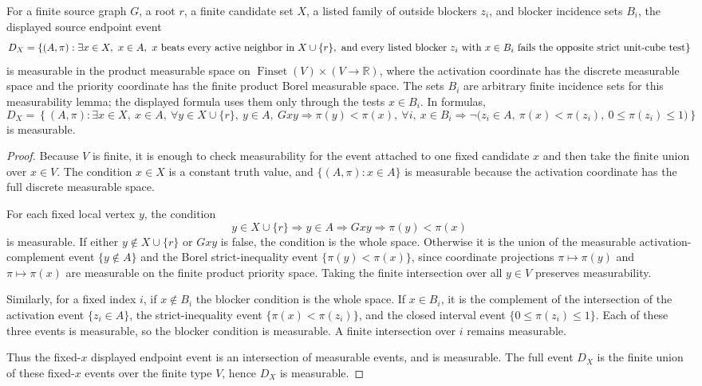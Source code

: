\begin{helper}
For a finite source graph \(G\), a root \(r\), a finite candidate set
\(X\), a listed family of outside blockers \(z_i\), and blocker incidence
sets \(B_i\), the displayed source endpoint event
\[
  D_X=\{(A,\pi):\exists x\in X,\ x\in A,\ x \hbox{ beats every active
  neighbor in }X\cup\{r\},\ \text{and every listed blocker }z_i
  \text{ with }x\in B_i\text{ fails the opposite strict unit-cube test}\}
\]
is measurable in the product measurable space on
\(\operatorname{Finset}(V)\times (V\to\mathbb R)\), where the activation
coordinate has the discrete measurable space and the priority coordinate has
the finite product Borel measurable space.  The sets \(B_i\) are arbitrary
finite incidence sets for this measurability lemma; the displayed formula
uses them only through the tests \(x\in B_i\).  In formulas,
\[
  D_X=
  \left\{(A,\pi):\exists x\in X,\ x\in A,\ 
    \forall y\in X\cup\{r\},\ y\in A,\ Gxy\Rightarrow \pi(y)<\pi(x),
    \ \forall i,\ x\in B_i\Rightarrow
      \neg\bigl(z_i\in A,\ \pi(x)<\pi(z_i),\ 0\le\pi(z_i)\le1\bigr)
  \right\}
\]
is measurable.
\end{helper}
\begin{proof}
Because \(V\) is finite, it is enough to check measurability for the event
attached to one fixed candidate \(x\) and then take the finite union over
\(x\in V\).  The condition \(x\in X\) is a constant truth value, and
\(\{(A,\pi):x\in A\}\) is measurable because the activation coordinate has
the full discrete measurable space.

For each fixed local vertex \(y\), the condition
\[
  y\in X\cup\{r\}\Rightarrow y\in A\Rightarrow Gxy\Rightarrow \pi(y)<\pi(x)
\]
is measurable.  If either \(y\notin X\cup\{r\}\) or \(Gxy\) is false, the
condition is the whole space.  Otherwise it is the union of the measurable
activation-complement event \(\{y\notin A\}\) and the Borel strict-inequality
event \(\{\pi(y)<\pi(x)\}\), since coordinate projections
\(\pi\mapsto\pi(y)\) and \(\pi\mapsto\pi(x)\) are measurable on the finite
product priority space.  Taking the finite intersection over all \(y\in V\)
preserves measurability.

Similarly, for a fixed index \(i\), if \(x\notin B_i\) the blocker condition
is the whole space.  If \(x\in B_i\), it is the complement of the intersection
of the activation event \(\{z_i\in A\}\), the strict-inequality event
\(\{\pi(x)<\pi(z_i)\}\), and the closed interval event
\(\{0\le \pi(z_i)\le1\}\).  Each of these three events is measurable, so the
blocker condition is measurable.  A finite intersection over \(i\) remains
measurable.

Thus the fixed-\(x\) displayed endpoint event is an intersection of measurable
events, and is measurable.  The full event \(D_X\) is the finite union of
these fixed-\(x\) events over the finite type \(V\), hence \(D_X\) is
measurable.
\end{proof}
